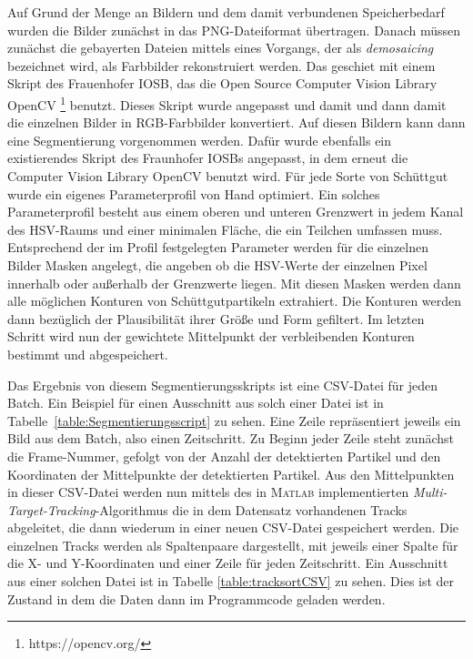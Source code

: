 Auf Grund der Menge an Bildern und dem damit verbundenen Speicherbedarf wurden die Bilder zunächst in das PNG-Dateiformat übertragen.
Danach müssen zunächst die gebayerten Dateien mittels eines Vorgangs, der als \textit{demosaicing} bezeichnet wird,
als Farbbilder rekonstruiert werden.
Das geschiet mit einem Skript des Frauenhofer IOSB, das die Open Source Computer Vision Library OpenCV \footnote{https://opencv.org/} benutzt.
Dieses Skript wurde angepasst und damit und dann damit die einzelnen Bilder in RGB-Farbbilder konvertiert.
Auf diesen Bildern kann dann eine Segmentierung vorgenommen werden.
Dafür wurde ebenfalls ein existierendes Skript des Fraunhofer IOSBs angepasst, in dem erneut die Computer Vision Library OpenCV benutzt wird.
Für jede Sorte von Schüttgut wurde ein eigenes Parameterprofil von Hand optimiert.
Ein solches Parameterprofil besteht aus einem oberen und unteren Grenzwert in jedem Kanal des HSV-Raums und einer minimalen Fläche, die ein Teilchen umfassen muss.
Entsprechend der im Profil festgelegten Parameter werden für die einzelnen Bilder Masken angelegt,
die angeben ob die HSV-Werte der einzelnen Pixel innerhalb oder außerhalb der Grenzwerte liegen. 
Mit diesen Masken werden dann alle möglichen Konturen von Schüttgutpartikeln extrahiert. 
Die Konturen werden dann bezüglich der Plausibilität ihrer Größe und Form gefiltert. 
Im letzten Schritt wird nun der gewichtete Mittelpunkt der verbleibenden Konturen bestimmt und abgespeichert.


Das Ergebnis von diesem Segmentierungsskripts ist eine CSV-Datei für jeden Batch.
Ein Beispiel für einen Ausschnitt aus solch einer Datei ist in Tabelle~\ref{table:Segmentierungsscript} zu sehen.
Eine Zeile repräsentiert jeweils ein Bild aus dem Batch, also einen Zeitschritt.
Zu Beginn jeder Zeile steht zunächst die Frame-Nummer, gefolgt von der Anzahl der detektierten Partikel
und den Koordinaten der Mittelpunkte der detektierten Partikel.
Aus den Mittelpunkten in dieser CSV-Datei werden nun mittels des in \textsc{Matlab} implementierten \textit{Multi-Target-Tracking}-Algorithmus die in dem Datensatz vorhandenen Tracks abgeleitet,
die dann wiederum in einer neuen CSV-Datei gespeichert werden.
Die einzelnen Tracks werden als Spaltenpaare dargestellt, mit jeweils einer Spalte für die X- und Y-Koordinaten und einer Zeile für jeden Zeitschritt.
Ein Ausschnitt aus einer solchen Datei ist in Tabelle \ref{table:tracksortCSV} zu sehen.
Dies ist der Zustand in dem die Daten dann im Programmcode geladen werden. 

